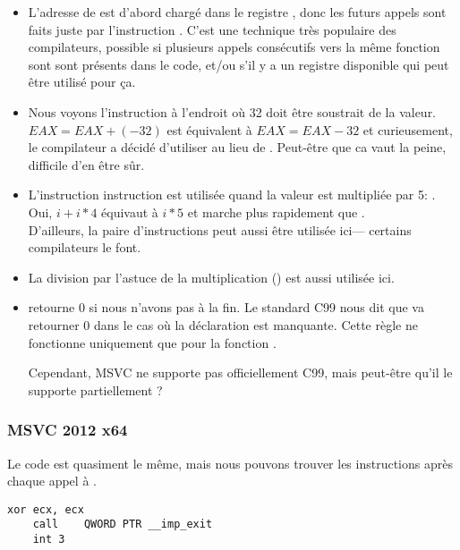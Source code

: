 \begin{itemize}
\item L'adresse de \printf est d'abord chargé dans le
registre \ESI, donc les futurs
appels \printf sont faits juste par l'instruction .
C'est une technique très populaire
des compilateurs, possible si plusieurs appels consécutifs vers la même fonction sont sont présents
dans le code, et/ou s'il y a un registre disponible qui peut être utilisé pour ça.

\item Nous voyons l'instruction  
à l'endroit où 32 doit être soustrait de la valeur.
$EAX=EAX+(-32)$ est équivalent à $EAX=EAX-32$ 
et curieusement, le compilateur a décidé d'utiliser  au lieu de .
Peut-être que ca vaut la peine, difficile d'en être sûr.

\item L'instruction \LEA instruction est utilisée quand 
la valeur est multipliée par 5: .
Oui, $i+i*4$ équivaut à $i*5$ et \LEA 
marche plus rapidement que .\\
D'ailleurs, la paire d'instructions  peut aussi être utilisée ici---
certains compilateurs le font.

\item La division par l'astuce de la multiplication () 
est aussi utilisée ici.

\item \main retourne 0 si nous n'avons pas  
à la fin.
Le standard C99 nous dit  que \main 
va retourner 0 dans le cas où 
la déclaration  est manquante.
Cette règle ne fonctionne uniquement que pour la fonction \main.

Cependant, MSVC ne supporte pas officiellement C99, mais peut-être qu'il le supporte partiellement ?
\end{itemize}

\subsubsection{\Optimizing MSVC 2012 x64}

Le code est quasiment le même, mais nous pouvons trouver les instructions  après chaque appel à .

\begin{lstlisting}[style=customasmx86]
	xor	ecx, ecx
	call	QWORD PTR __imp_exit
	int	3
\end{lstlisting}

